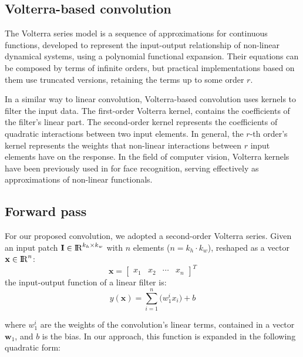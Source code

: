 \documentclass[10pt,twocolumn,letterpaper]{article}
\renewcommand{\vec}[1]{\mathbf{#1}}
\begin{document}
       \subsection{Volterra-based convolution}
       
     The Volterra series model is a sequence of approximations for continuous functions, developed to represent the input-output relationship of non-linear dynamical systems, using a polynomial functional expansion. Their equations can be composed by terms of infinite orders, but practical implementations based on them use truncated versions, retaining the terms up to some order $r$.
     
      In a similar way to linear convolution, Volterra-based convolution uses kernels to filter the input data. The first-order Volterra kernel, contains the coefficients of the filter's linear part. The second-order kernel represents the coefficients of quadratic interactions between two input elements. In general, the $r$-th order's kernel represents the weights that non-linear interactions between $r$ input elements have on the response. In the field of computer vision, Volterra kernels have been previously used in \cite{Volterrafaces} for face recognition, serving effectively as approximations of non-linear functionals.

     \subsection{Forward pass}
       
     For our proposed convolution, we adopted a second-order Volterra series. Given an input patch $\vec{I}\in{\rm I\!R}^{k_h \times k_w}$ with $n$ elements ($n=k_h\cdot k_w$), reshaped as 
a vector $\vec{x}\in{\rm I\!R}^{n}$:
\begin{equation}
\vec{x} = { \begin{bmatrix} x_1 & x_2 & \cdots & x_n \end{bmatrix} }^T
\end{equation}
the input-output function of a linear filter is:
    \begin{equation}	\label{eq_fp_lin}
       y(\vec{x}) = 
	      \sum_{i=1}^{n}{
	          \big(w_1^ix_i\big)} 
	    + b
    \end{equation}
    
    where $w_1^i$ are the weights of the convolution's linear terms, contained in a vector $\vec{w}_1$, and $b$ is the bias. In our approach, this function is expanded in the following quadratic form:
     
\end{document}
